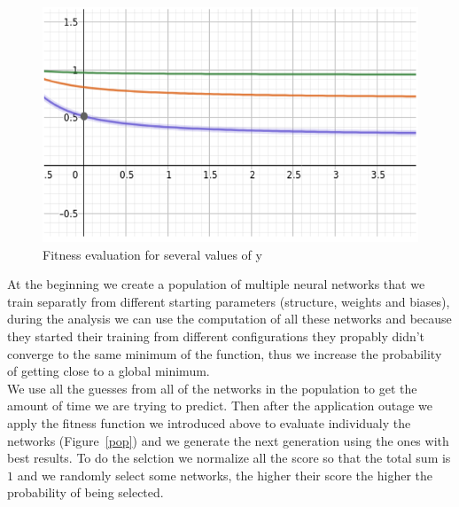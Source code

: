 \documentclass[10pt,a4paper,oneside]{article}
\begin{document}
\vspace{0.8cm}

\begin{figure}[!ht]
\centering
\includegraphics[scale=0.7]{./images/fitness.png}
\caption{Fitness evaluation for several values of y}
\label{fonction}
\end{figure}

\vspace{0.8cm}

\begin{multicols}{2}
At the beginning we create a population of multiple neural networks that we train separatly from different starting parameters (structure, weights and biases), during the analysis we can use the computation of all these networks and because they started their training from different configurations they propably didn't converge to the same minimum of the function, thus we increase the probability of getting close to a global minimum. 
\\We use all the guesses from all of the networks in the population to get the amount of time we are trying to predict. Then after the application outage we apply the fitness function we introduced above to evaluate individualy the networks (Figure~\ref{pop}) and we generate the next generation using the ones with best results. To do the selction we normalize all the score so that the total sum is $1$ and we randomly select some networks, the higher their score the higher the probability of being selected.
\end{multicols}

\vspace{0.8cm}
\end{document}
